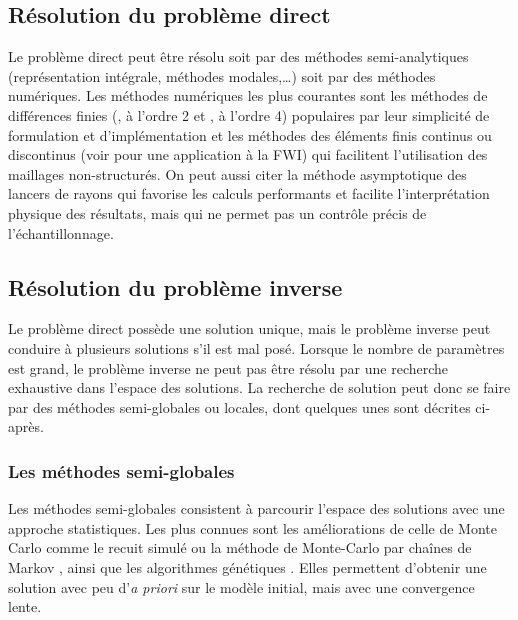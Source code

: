 \subsection{Résolution du problème direct}

Le problème direct peut être résolu soit par des méthodes semi-analytiques (représentation intégrale, méthodes modales,\ldots) soit par des méthodes numériques. Les méthodes numériques les plus courantes sont les méthodes de différences finies (\citealp{virieux_86}, à l'ordre 2 et \citealp{levander}, à l'ordre 4) populaires par leur simplicité de formulation et d'implémentation et les méthodes des éléments finis continus \citep{marfurt} ou discontinus (voir \citealp{brossier_these} pour une application à la FWI) qui facilitent l'utilisation des maillages non-structurés. On peut aussi citer la méthode asymptotique des lancers de rayons \citep{virieux_ray} qui favorise les calculs performants et facilite l'interprétation physique des résultats, mais qui ne permet pas un contrôle précis de l'échantillonnage.


\subsection{Résolution du problème inverse}
Le problème direct possède une solution unique, mais le problème inverse peut conduire à plusieurs solutions s'il est mal posé.
Lorsque le nombre de paramètres est grand, le problème inverse ne peut pas être résolu par une recherche exhaustive dans l'espace des solutions. La recherche de solution peut donc se faire par des méthodes semi-globales ou locales, dont quelques unes sont décrites ci-après.\\

\subsubsection{Les méthodes semi-globales}
Les méthodes semi-globales consistent à parcourir l'espace des solutions avec une approche statistiques. Les plus connues sont les améliorations de celle de Monte Carlo comme le recuit simulé \citep{tarantola_book, sen} ou  la méthode de Monte-Carlo par chaînes de Markov \citep{zhang}, ainsi que les algorithmes génétiques \citep{stoffa}. Elles permettent d'obtenir une solution avec peu d'\emph{a priori} sur le modèle initial, mais avec une convergence lente.\\

